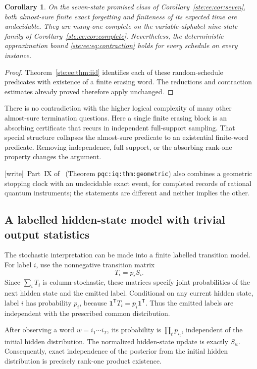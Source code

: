 \documentclass[11pt,letterpaper]{article}
\newtheorem{corollary}[theorem]{Corollary}
\theoremstyle{definition}
\theoremstyle{remark}
\newcommand{\one}{\mathbf 1}
\newcommand{\transpose}{^{\mathsf T}}
\newcommand{\wtag}{\textup{[write]}}
\begin{document}
\begin{corollary}\label{ste:ee:cor:randomhard}
On the seven-state promised class of Corollary~\ref{ste:ee:cor:seven}, both almost-sure
finite exact forgetting and finiteness of its expected time are undecidable.
They are many-one complete on the variable-alphabet nine-state family of
Corollary~\ref{ste:ee:cor:complete}. Nevertheless, the deterministic approximation
bound \eqref{ste:ee:eq:contraction} holds for every schedule on every instance.
\end{corollary}
\begin{proof}
Theorem~\ref{ste:ee:thm:iid} identifies each of these random-schedule predicates with
existence of a finite erasing word. The reductions and contraction estimates
already proved therefore apply unchanged.
\end{proof}

There is no contradiction with the higher logical complexity of many other
almost-sure termination questions. Here a single finite erasing block is an
absorbing certificate that recurs in independent full-support sampling. That
special structure collapses the almost-sure predicate to an existential
finite-word predicate. Removing independence, full support, or the absorbing
rank-one property changes the argument.

\wtag\ Part~IX of~\cite{pqc} (Theorem \texttt{pqc:iq:thm:geometric}) also combines a geometric stopping clock with an undecidable exact event, for completed records of rational quantum instruments; the statements are different and neither implies the other.

\subsection{A labelled hidden-state model with trivial output statistics}

The stochastic interpretation can be made into a finite labelled transition
model. For label $i$, use the nonnegative transition matrix
\[
 T_i=p_iS_i.
\]
Since $\sum_iT_i$ is column-stochastic, these matrices specify joint probabilities
of the next hidden state and the emitted label. Conditional on any current hidden
state, label $i$ has probability $p_i$, because
$\one\transpose T_i=p_i\one\transpose$. Thus the emitted labels are independent
with the prescribed common distribution.

After observing a word $w=i_1\cdots i_T$, its probability is
$\prod_t p_{i_t}$, independent of the initial hidden distribution. The normalized
hidden-state update is exactly $S_w$. Consequently, exact independence of the
posterior from the initial hidden distribution is precisely rank-one product
existence.
\end{document}
